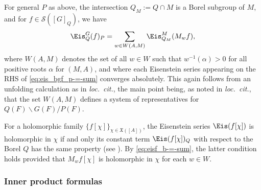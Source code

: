 For general $P$ as above, the intersection $Q_{M} := Q \cap M$ is a Borel subgroup of $M$, and for $f \in \mathcal{S}([G]_Q)$, we have
\begin{equation}\label{eq:eis_bgf_p-=-sum}
  \Eis_Q^G(f)_P = \sum_{w \in W(A,M)} \Eis_{Q_{M}}^{M} (M_w f),
\end{equation}
where $W(A,M)$ denotes the set of all $w \in W$ such that $w^{-1}(\alpha) > 0$ for all positive roots $\alpha$ for $(M,A)$, and where each Eisenstein series appearing on the RHS of \eqref{eq:eis_bgf_p-=-sum} converges absolutely.  This again follows from an unfolding calculation as in \emph{loc.\ cit.}, the main point being, as noted in \emph{loc.\ cit.}, that the set $W(A,M)$ defines a system of representatives for $Q(F) \backslash G(F) / P(F)$.

For a holomorphic family $\{f[\chi]\}_{\chi \in \mathfrak{X}([A])}$, the Eisenstein series $\Eis(f[\chi])$ is holomorphic in $\chi$ if and only its constant term $\Eis(f[\chi])_Q$ with respect to the Borel $Q$ has the same property (see \cite[\S I.4.10 and Remark p167]{MR1361168}).  By \eqref{eq:eisf_b-=-sum}, the latter condition holds provided that $M_w f[\chi]$ is holomorphic in $\chi$ for each $w \in W$.

\subsubsection{Inner product formulas}

